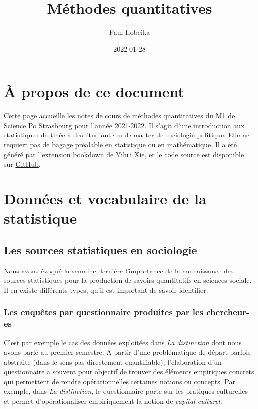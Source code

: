 \documentclass[
]{book}
\title{Méthodes quantitatives}
\author{Paul Hobeika}
\date{2022-01-28}
\begin{document}
\maketitle

{
\setcounter{tocdepth}{1}
\tableofcontents
}
\hypertarget{uxe0-propos-de-ce-document}{%
\chapter*{À propos de ce document}\label{uxe0-propos-de-ce-document}}

Cette page accueille les notes de cours de méthodes quantitatives du M1 de Science Po Strasbourg pour l'année 2021-2022. Il s'agit d'une introduction aux statistiques destinée à des étudiant·es de master de sociologie politique. Elle ne requiert pas de bagage préalable en statistique ou en mathématique. Il a été généré par l'extension \href{https://bookdown.org/}{bookdown} de Yihui Xie, et le code source est disponible sur \href{https://github.com/phobeika/quanti}{GitHub}.

\hypertarget{donnuxe9es-et-vocabulaire-de-la-statistique}{%
\chapter{Données et vocabulaire de la statistique}\label{donnuxe9es-et-vocabulaire-de-la-statistique}}

\hypertarget{les-sources-statistiques-en-sociologie}{%
\section{Les sources statistiques en sociologie}\label{les-sources-statistiques-en-sociologie}}

Nous avons évoqué la semaine dernière l'importance de la connaissance des sources statistiques pour la production de savoirs quantitatifs en sciences sociale. Il en existe différents types, qu'il est important de savoir identifier.

\hypertarget{les-enquuxeates-par-questionnaire-produites-par-les-chercheur-es}{%
\subsection{Les enquêtes par questionnaire produites par les chercheur-es}\label{les-enquuxeates-par-questionnaire-produites-par-les-chercheur-es}}

C'est par exemple le cas des données exploitées dans \emph{La distinction} \citep{bourdieu1979} dont nous avons parlé au premier semestre. A partir d'une problématique de départ parfois abstraite (dans le sens pas directement quantifiable), l'élaboration d'un questionnaire a souvent pour objectif de trouver des éléments empiriques concrets qui permettent de rendre opérationnelles certaines notions ou concepts. Par exemple, dans \emph{La distinction}, le questionnaire porte sur les pratiques culturelles et permet d'opérationaliser empiriquement la notion de \emph{capital culturel}.
\end{document}
